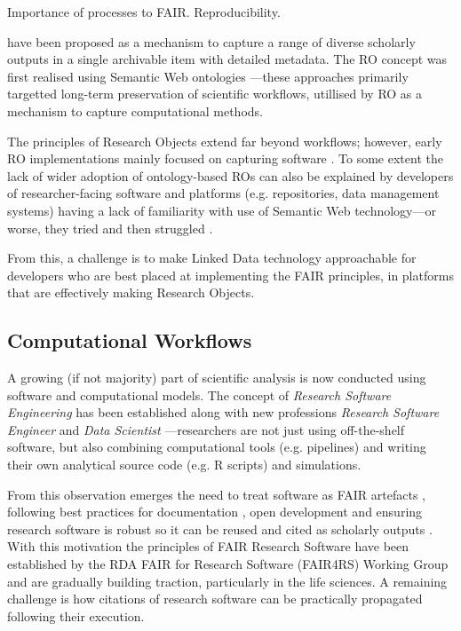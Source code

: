 Importance of processes to FAIR. Reproducibility. 

\cite{Bechhofer 2013} have been proposed as a mechanism to capture a range of diverse scholarly outputs in a single archivable item with detailed metadata. The RO concept was first realised using Semantic Web ontologies \cite{myExperiment 2009,Belhajjame 2015}---these approaches primarily targetted long-term preservation of \glspl{scientific workflow}, utillised by RO as a mechanism to capture computational methods.

The principles of Research Objects extend far beyond workflows; however, early RO implementations mainly focused on capturing software \cite{Goble 2018}. To some extent the lack of wider adoption of ontology-based ROs can also be explained by developers of researcher-facing software and platforms (e.g. repositories, data management systems) having a lack of familiarity with use of Semantic Web technology---or worse, they tried and then struggled \cite{Carriero 2010,Tudorache 2020}.

From this, a challenge is to make Linked Data technology approachable for developers who are best placed at implementing the FAIR principles, in platforms that are effectively making Research Objects.




\subsection{Computational Workflows}

A growing (if not majority) part of scientific analysis is now conducted using software and computational models. The concept of \emph{Research Software Engineering} \cite{Cohen 2020} has been established along with new professions \emph{Research Software Engineer} \cite{Baxter 2012} and \emph{Data Scientist} \cite{van der Aalst 2014}---researchers are not just using off-the-shelf software, but also combining computational tools (e.g. pipelines) and writing their own analytical source code (e.g. R scripts) and simulations.

From this observation emerges the need to treat software as FAIR artefacts \cite{Lamprecht 2019}, following best practices for documentation \cite{Lee 2018}, open development \cite{Prlić 2012} and ensuring research software is robust \cite{Taschuk 2017} so it can be reused and cited as scholarly outputs \cite{Smith 2016}. 
With this motivation the principles of FAIR Research Software \cite{Katz 2021b} have been established by the RDA FAIR for Research Software (FAIR4RS) Working Group \cite{Barker 2022} and are gradually building traction, particularly in the life sciences. A remaining challenge is how citations of research software can be practically propagated following their execution. 

